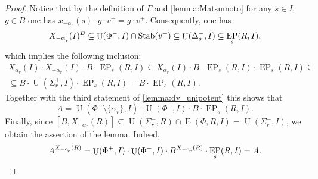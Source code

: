 \documentclass[oneside, 12pt]{amsart}
\theoremstyle{plain}
\numberwithin{equation}{section}
\numberwithin{lemma}{section}
\theoremstyle{definition}
\theoremstyle{remark}
\DeclareMathOperator{\E}{E}
\DeclareMathOperator{\EP}{EP}
\DeclareMathOperator{\U}{U}
\DeclareMathOperator{\Stab}{Stab}
\def\ssub#1{\mathchoice
   {_{\lower2pt\hbox{$\scriptstyle #1$}}}
   {_{\lower2pt\hbox{$\scriptstyle #1$}}}
   {_{\lower1.5pt\hbox{$\scriptscriptstyle #1$}}}
   {_{\!\lower1.5pt\hbox{$\scriptscriptstyle #1$}}}}
\begin{document}
\begin{proof}
Notice that by the definition of $\Gamma$ and \cref{lemma:Matsumoto} for any $s\in I$, $ g\in B$ one has $x_{-\alpha_r}(s) \cdot g \cdot v^+ = g \cdot v^+$.
Consequently, one has
\[ X_{-\alpha\ssub{r}}(I)^{B} \subseteq \U(\Phi^-, I) \cap \Stab(v^+) \subseteq \U(\Delta_s^-, I) \subseteq \EP_s(R, I), \]
which implies the following inclusion:
\begin{multline*}
X_{\alpha_r}(I) \cdot X_{-\alpha_r}(I) \cdot B \cdot \EP_s(R, I) \subseteq 
X_{\alpha_r}(I) \cdot B \cdot \EP_s(R, I) \cdot \EP_s(R, I) \subseteq \\
\subseteq B \cdot \U(\Sigma_r^+, I) \cdot \EP_s(R, I) =
B \cdot \EP_s(R, I).
\end{multline*}
Together with the third statement of \cref{lemma:dv_unipotent} this shows that
\begin{equation*} \label{rel:sred}
A = \U(\Phi^+\setminus\{\alpha_r\}, I) \cdot \U(\Phi^-, I) \cdot B \cdot \EP_s(R, I).
\end{equation*}
Finally, since $[B, X_{-\alpha_r}(R)] \subseteq \U(\Sigma_r^-, R) \cap \E(\Phi, R, I) = \U(\Sigma_r^-, I)$, we obtain the assertion of the lemma. Indeed,
\begin{equation*} \label{rel:ninv} A^{X_{-\alpha\ssub{r}}(R)} = \U(\Phi^+, I) \cdot \U(\Phi^-, I) \cdot B ^{X_{-\alpha\ssub{r}}(R)} \cdot \EP_s(R, I) = A. \qedhere \end{equation*}
\end{proof}
\end{document}
